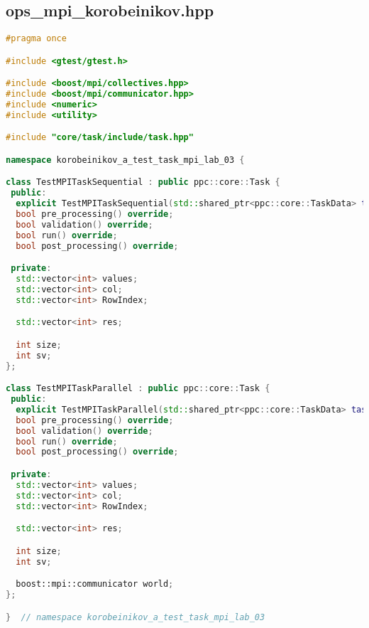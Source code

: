 \documentclass[12pt]{article}
\begin{document}
\subsection*{ops\_mpi\_korobeinikov.hpp}
\begin{lstlisting}[language=C++]
#pragma once

#include <gtest/gtest.h>

#include <boost/mpi/collectives.hpp>
#include <boost/mpi/communicator.hpp>
#include <numeric>
#include <utility>

#include "core/task/include/task.hpp"

namespace korobeinikov_a_test_task_mpi_lab_03 {

class TestMPITaskSequential : public ppc::core::Task {
 public:
  explicit TestMPITaskSequential(std::shared_ptr<ppc::core::TaskData> taskData_) : Task(std::move(taskData_)) {}
  bool pre_processing() override;
  bool validation() override;
  bool run() override;
  bool post_processing() override;

 private:
  std::vector<int> values;
  std::vector<int> col;
  std::vector<int> RowIndex;

  std::vector<int> res;

  int size;
  int sv;
};

class TestMPITaskParallel : public ppc::core::Task {
 public:
  explicit TestMPITaskParallel(std::shared_ptr<ppc::core::TaskData> taskData_) : Task(std::move(taskData_)) {}
  bool pre_processing() override;
  bool validation() override;
  bool run() override;
  bool post_processing() override;

 private:
  std::vector<int> values;
  std::vector<int> col;
  std::vector<int> RowIndex;

  std::vector<int> res;

  int size;
  int sv;

  boost::mpi::communicator world;
};

}  // namespace korobeinikov_a_test_task_mpi_lab_03

\end{lstlisting}
\end{document}
